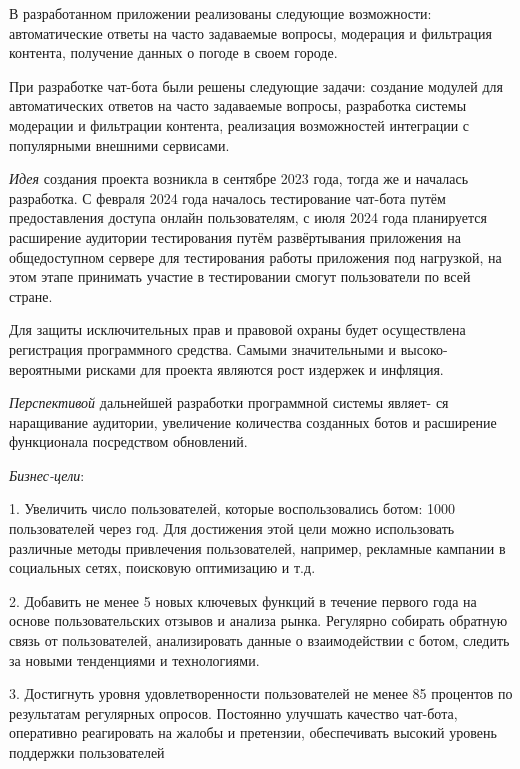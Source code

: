 В разработанном приложении реализованы следующие возможности: автоматические ответы на часто задаваемые вопросы, модерация и фильтрация контента, получение данных о погоде в своем городе.

При разработке чат-бота были решены следующие задачи: создание модулей для автоматических ответов на часто задаваемые вопросы, разработка системы модерации и фильтрации контента, реализация возможностей интеграции с популярными внешними сервисами.

\emph{Идея} создания проекта возникла в сентябре 2023 года, тогда же и началась разработка. С февраля 2024 года началось тестирование чат-бота  путём предоставления доступа онлайн пользователям, с июля 2024 года планируется расширение аудитории тестирования путём развёртывания приложения на общедоступном сервере для тестирования работы приложения под нагрузкой, на этом этапе принимать участие в тестировании смогут пользователи по всей стране. 

Для защиты исключительных прав и правовой охраны будет осуществлена регистрация программного средства.
Самыми значительными и высоко-вероятными рисками для проекта
являются рост издержек и инфляция.

\emph{Перспективой} дальнейшей разработки программной системы являет- ся наращивание аудитории, увеличение количества созданных ботов и расширение функционала посредством обновлений.

\emph{Бизнес-цели}:

1.	Увеличить число пользователей, которые воспользовались ботом: 1000 пользователей через год. Для достижения этой цели можно использовать различные методы привлечения пользователей, например, рекламные кампании в социальных сетях, поисковую оптимизацию и т.д.

2.	Добавить не менее 5 новых ключевых функций в течение первого года на основе пользовательских отзывов и анализа рынка. Регулярно собирать обратную связь от пользователей, анализировать данные о взаимодействии с ботом, следить за новыми тенденциями и технологиями.

3.	Достигнуть уровня удовлетворенности пользователей не менее 85 процентов по результатам регулярных опросов. Постоянно улучшать качество чат-бота, оперативно реагировать на жалобы и претензии, обеспечивать высокий уровень поддержки пользователей

